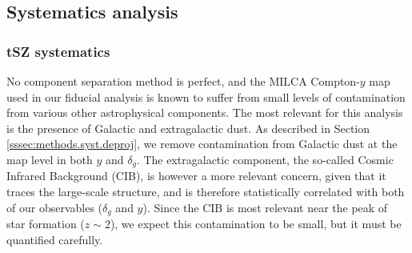 \documentclass[useAMS,usenatbib]{mn2e}
\begin{document}
  \subsection{Systematics analysis}\label{ssec:results.syst}
    \subsubsection{tSZ systematics}\label{sssec:results.syst.y}
      No component separation method is perfect, and the MILCA Compton-$y$ map used in our fiducial analysis is known to suffer from small levels of contamination from various other astrophysical components. The most relevant for this analysis is the presence of Galactic and extragalactic dust. As described in Section \ref{sssec:methods.syst.deproj}, we remove contamination from Galactic dust at the map level in both $y$ and $\delta_g$. The extragalactic component, the so-called Cosmic Infrared Background (CIB), is however a more relevant concern, given that it traces the large-scale structure, and is therefore statistically correlated with both of our observables ($\delta_g$ and $y$). Since the CIB is most relevant near the peak of star formation ($z\sim2$), we expect this contamination to be small, but it must be quantified carefully.
      
\end{document}
